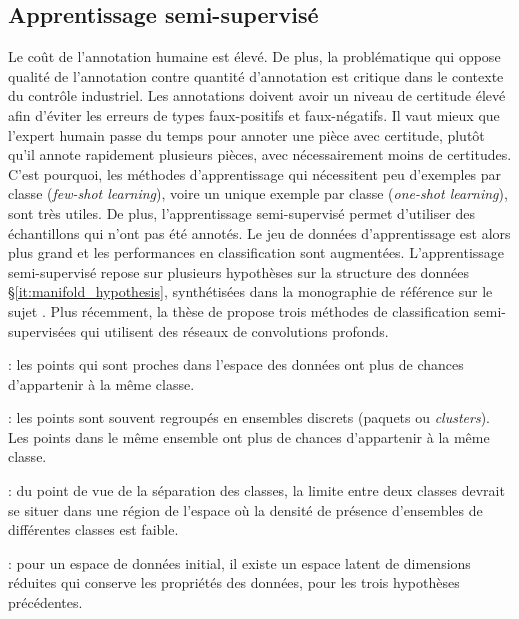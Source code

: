 \subsection{Apprentissage semi-supervisé} \label{subsec:semi_supervised}
Le coût de l'annotation humaine est élevé.
De plus, la problématique qui oppose qualité de l'annotation contre quantité d'annotation est critique dans le contexte du contrôle industriel.
Les annotations doivent avoir un niveau de certitude élevé afin d'éviter les erreurs de types faux-positifs et faux-négatifs.
Il vaut mieux que l'expert humain passe du temps pour annoter une pièce avec certitude, plutôt qu'il annote rapidement plusieurs pièces, avec nécessairement moins de certitudes.
C'est pourquoi, les méthodes d'apprentissage qui nécessitent peu d'exemples par classe (\textit{few-shot learning}), voire un unique exemple par classe (\textit{one-shot learning}), sont très utiles.
De plus, l'apprentissage semi-supervisé permet d'utiliser des échantillons qui n'ont pas été annotés.
Le jeu de données d'apprentissage est alors plus grand et les performances en classification sont augmentées.
L'apprentissage semi-supervisé repose sur plusieurs hypothèses sur la structure des données §\ref{it:manifold_hypothesis}, synthétisées dans la monographie de référence sur le sujet  \cite{chapelle_semi-supervised_2010}.
Plus récemment, la thèse de \citeauthor{durand_weakly_2017} \cite{durand_weakly_2017} propose trois méthodes de classification semi-supervisées qui utilisent des réseaux de convolutions profonds.

\begin{description} \label{it:manifold_hypothesis}
	\item[Hypothèse de continuité] : les points qui sont proches dans l'espace des données ont plus de chances d'appartenir à la même classe.
	\item[Hypothèse d'ensembles] : les points sont souvent regroupés en ensembles discrets (paquets ou \textit{clusters}). Les points dans le même ensemble ont plus de chances d'appartenir à la même classe.
	\item[Hypothèse de densité faible] : du point de vue de la séparation des classes, la limite entre deux classes devrait se situer dans une région de l'espace où la densité de présence d'ensembles de différentes classes est faible.
	\item[Hypothèse de variétés] : pour un espace de données initial, il existe un espace latent de dimensions réduites qui conserve les propriétés des données, pour les trois hypothèses précédentes.
\end{description}

